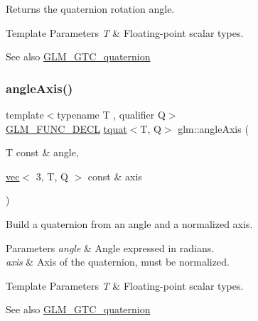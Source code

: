 Returns the quaternion rotation angle.


\begin{DoxyTemplParams}{Template Parameters}
{\em T} & Floating-\/point scalar types.\\
\hline
\end{DoxyTemplParams}
\begin{DoxySeeAlso}{See also}
\hyperlink{group__gtc__quaternion}{G\+L\+M\+\_\+\+G\+T\+C\+\_\+quaternion} 
\end{DoxySeeAlso}
\mbox{\label{group__gtc__quaternion_ga93856b8bfcdd5b9a164248df3149476c}} 
\subsubsection{\texorpdfstring{angle\+Axis()}{angleAxis()}}
{\footnotesize\ttfamily template$<$typename T , qualifier Q$>$ \\
\hyperlink{setup_8hpp_ab2d052de21a70539923e9bcbf6e83a51}{G\+L\+M\+\_\+\+F\+U\+N\+C\+\_\+\+D\+E\+CL} \hyperlink{structglm_1_1tquat}{tquat}$<$T, Q$>$ glm\+::angle\+Axis (\begin{DoxyParamCaption}\item[{T const \&}]{angle,  }\item[{\hyperlink{structglm_1_1vec}{vec}$<$ 3, T, Q $>$ const \&}]{axis }\end{DoxyParamCaption})}

Build a quaternion from an angle and a normalized axis.


\begin{DoxyParams}{Parameters}
{\em angle} & Angle expressed in radians. \\
\hline
{\em axis} & Axis of the quaternion, must be normalized. \\
\hline
\end{DoxyParams}

\begin{DoxyTemplParams}{Template Parameters}
{\em T} & Floating-\/point scalar types.\\
\hline
\end{DoxyTemplParams}
\begin{DoxySeeAlso}{See also}
\hyperlink{group__gtc__quaternion}{G\+L\+M\+\_\+\+G\+T\+C\+\_\+quaternion} 
\end{DoxySeeAlso}
\mbox{\label{group__gtc__quaternion_gaaf2707d3081789ce097daaa6e54d5287}} 
